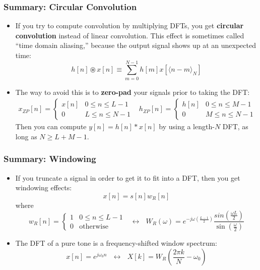 \documentclass{beamer}
\begin{document}
\begin{frame}
  \frametitle{Summary: Circular Convolution}

  \begin{itemize}
  \item If you try to compute convolution by multiplying DFTs, you get
    {\bf circular convolution} instead of linear convolution.  This effect
    is sometimes called ``time domain aliasing,'' because the output
    signal shows up at an unexpected time:
    \begin{displaymath}
      h[n]\circledast x[n] \equiv \sum_{m=0}^{N-1} h\left[m\right]x\left[\langle n-m\rangle_N\right]
    \end{displaymath}
  \item The way to avoid this is to {\bf zero-pad} your signals prior
    to taking the DFT:
    \begin{align*}
      x_{ZP}[n] =\begin{cases}x[n] & 0\le n\le L-1\\0 & L\le n\le N-1\end{cases}&
      h_{ZP}[n] =\begin{cases}h[n] & 0\le n\le M-1\\0 & M\le n\le N-1\end{cases}
    \end{align*}
    Then you can compute $y[n]=h[n]\ast x[n]$ by using a length-$N$ DFT, as long as
    $N\ge L+M-1$.
  \end{itemize}
\end{frame}

\begin{frame}
  \frametitle{Summary: Windowing}

  \begin{itemize}
  \item If you truncate a signal in order to get it to fit into a DFT,
    then you get windowing effects:
    \begin{displaymath}
      x[n]=s[n]w_R[n]
    \end{displaymath}
    where
    \begin{displaymath}
      w_R[n]=\begin{cases}1&0\le n\le L-1\\0&\mbox{otherwise}\end{cases}~~~\leftrightarrow~~~
      W_R(\omega)=e^{-j\omega\left(\frac{L-1}{2}\right)}
      \frac{sin\left(\frac{\omega L}{2}\right)}{\sin\left(\frac{\omega}{2}\right)}
    \end{displaymath}
  \item The DFT of a pure tone is a frequency-shifted window spectrum:
    \begin{displaymath}
      x[n]=e^{j\omega_0 n}~~~\leftrightarrow~~~
      X[k]=W_R\left(\frac{2\pi k}{N}-\omega_0\right)
    \end{displaymath}
  \end{itemize}
\end{frame}
\end{document}
